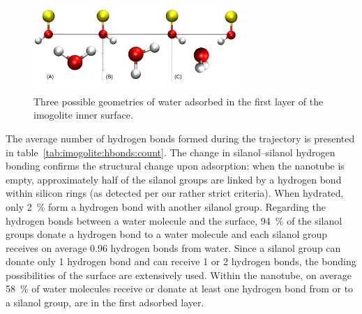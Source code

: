 \documentclass[thesis]{subfiles}
\begin{document}
\begin{figure}[ht]
    \centering
    \includegraphics[width=0.7\textwidth]{figures/images/imogolite-hbonds-surface}
	\caption{Three possible geometries of water adsorbed in the first layer of
    the imogolite inner surface.}
    \label{fig:imogolite:hbonds:surface}
\end{figure}


The average number of hydrogen bonds formed during the trajectory is presented
in table~\ref{tab:imogolite:hbonds:count}. The change in silanol--silanol
hydrogen bonding confirms the structural change upon adsorption: when the
nanotube is empty, approximately half of the silanol groups are linked by a
hydrogen bond within silicon rings (as detected per our rather strict criteria).
When hydrated, only 2~\% form a hydrogen bond with another silanol group.
Regarding the hydrogen bonds between a water molecule and the surface, 94~\% of
the silanol groups donate a hydrogen bond to a water molecule and each silanol
group receives on average 0.96 hydrogen bonds from water. Since a silanol group
can donate only 1 hydrogen bond and can receive 1 or 2 hydrogen bonds, the
bonding possibilities of the surface are extensively used. Within the nanotube,
on average 58~\% of water molecules receive or donate at least one hydrogen bond
from or to a silanol group, \ie are in the first adsorbed layer.
\end{document}
